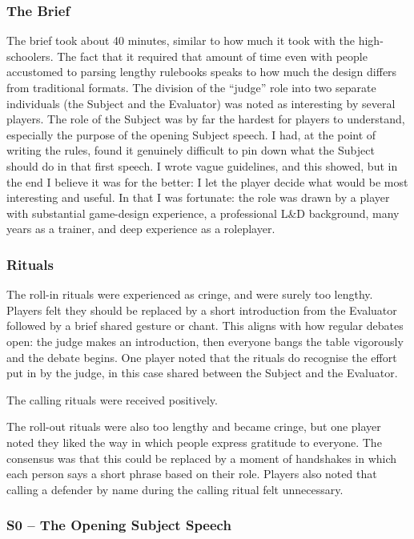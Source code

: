 \subsubsection{The Brief}

The brief took about 40 minutes, similar to how much it took with the high-schoolers. The fact that it required that amount of time even with people accustomed to parsing lengthy rulebooks speaks to how much the design differs from traditional formats. The division of the ``judge'' role into two separate individuals (the Subject and the Evaluator) was noted as interesting by several players. The role of the Subject was by far the hardest for players to understand, especially the purpose of the opening Subject speech. I had, at the point of writing the rules, found it genuinely difficult to pin down what the Subject should do in that first speech. I wrote vague guidelines, and this showed, but in the end I believe it was for the better: I let the player decide what would be most interesting and useful. In that I was fortunate: the role was drawn by a player with substantial game-design experience, a professional L\&D background, many years as a trainer, and deep experience as a roleplayer.

\subsubsection{Rituals}

The roll-in rituals were experienced as cringe, and were surely too lengthy. Players felt they should be replaced by a short introduction from the Evaluator followed by a brief shared gesture or chant. This aligns with how regular debates open: the judge makes an introduction, then everyone bangs the table vigorously and the debate begins. One player noted that the rituals do recognise the effort put in by the judge, in this case shared between the Subject and the Evaluator.

The calling rituals were received positively.

The roll-out rituals were also too lengthy and became cringe, but one player noted they liked the way in which people express gratitude to everyone. The consensus was that this could be replaced by a moment of handshakes in which each person says a short phrase based on their role. Players also noted that calling a defender by name during the calling ritual felt unnecessary.

\subsubsection{S0 -- The Opening Subject Speech}

